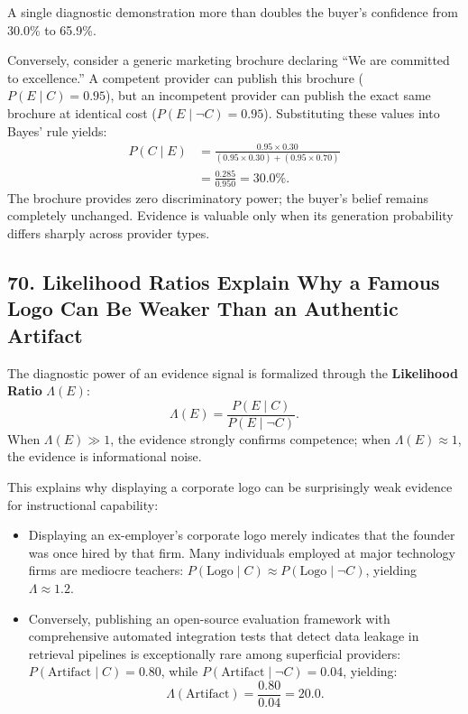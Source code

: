 A single diagnostic demonstration more than doubles the buyer's confidence from 30.0\% to 65.9\%. 

Conversely, consider a generic marketing brochure declaring ``We are committed to excellence.'' A competent provider can publish this brochure ($P(E \mid C) = 0.95$), but an incompetent provider can publish the exact same brochure at identical cost ($P(E \mid \neg C) = 0.95$). Substituting these values into Bayes' rule yields:
\begin{equation}
\begin{aligned}
P(C \mid E) &= \frac{0.95 \times 0.30}{(0.95 \times 0.30) + (0.95 \times 0.70)} \\
&= \frac{0.285}{0.950} = \mathbf{30.0\%}.
\end{aligned}
\end{equation}
The brochure provides zero discriminatory power; the buyer's belief remains completely unchanged. Evidence is valuable only when its generation probability differs sharply across provider types.

\subsection*{70. Likelihood Ratios Explain Why a Famous Logo Can Be Weaker Than an Authentic Artifact}

The diagnostic power of an evidence signal is formalized through the \textbf{Likelihood Ratio} $\Lambda(E)$:
\begin{equation}
\Lambda(E) = \frac{P(E \mid C)}{P(E \mid \neg C)}.
\end{equation}
When $\Lambda(E) \gg 1$, the evidence strongly confirms competence; when $\Lambda(E) \approx 1$, the evidence is informational noise.

This explains why displaying a corporate logo can be surprisingly weak evidence for instructional capability:
\begin{itemize}
\item Displaying an ex-employer's corporate logo merely indicates that the founder was once hired by that firm. Many individuals employed at major technology firms are mediocre teachers: $P(\text{Logo} \mid C) \approx P(\text{Logo} \mid \neg C)$, yielding $\Lambda \approx 1.2$.
\item Conversely, publishing an open-source evaluation framework with comprehensive automated integration tests that detect data leakage in retrieval pipelines is exceptionally rare among superficial providers: $P(\text{Artifact} \mid C) = 0.80$, while $P(\text{Artifact} \mid \neg C) = 0.04$, yielding:
\begin{equation}
\Lambda(\text{Artifact}) = \frac{0.80}{0.04} = \mathbf{20.0}.
\end{equation}
\end{itemize}

